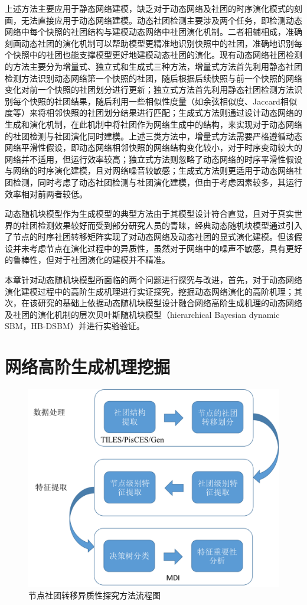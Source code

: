 上述方法主要应用于静态网络建模，缺乏对于动态网络及社团的时序演化模式的刻画，无法直接应用于动态网络建模。动态社团检测主要涉及两个任务，即检测动态网络中每个快照的社团结构与建模动态网络中社团演化机制。二者相辅相成，准确刻画动态社团的演化机制可以帮助模型更精准地识别快照中的社团，准确地识别每个快照中的社团也能支撑模型更好地建模动态社团的演化。现有动态网络社团检测的方法主要分为增量式、独立式和生成式三种方法，增量式方法首先利用静态社团检测方法识别动态网络第一个快照的社团，随后根据后续快照与前一个快照的网络变化对前一个快照的社团划分进行更新；独立式方法首先利用静态社团检测方法识别每个快照的社团结果，随后利用一些相似性度量（如余弦相似度、Jaccard相似度等）来将相邻快照的社团划分结果进行匹配；生成式方法则通过设计动态网络的生成和演化机制，在此机制中将社团作为网络生成中的结构，来实现对于动态网络的社团检测与社团演化同时建模。上述三类方法中，增量式方法需要严格遵循动态网络平滑性假设，即动态网络相邻快照的网络结构变化较小，对于时序变动较大的网络并不适用，但运行效率较高；独立式方法则忽略了动态网络的时序平滑性假设与网络的时序演化建模，且对网络噪音较敏感；生成式方法则更适用于动态网络社团检测，同时考虑了动态社团检测与社团演化建模，但由于考虑因素较多，其运行效率相对前两者较低。

动态随机块模型\cite{yang2011detecting}作为生成模型的典型方法由于其模型设计符合直觉，且对于真实世界的社团检测效果较好而受到部分研究人员的青睐，经典动态随机块模型通过引入了节点的时序社团转移矩阵实现了对动态网络及动态社团的显式演化建模。但该假设并未考虑节点在演化过程中的异质性，虽然对于网络中的噪声不敏感，具有更好的鲁棒性，但对于社团演化的建模并不精准。

本章针对动态随机块模型所面临的两个问题进行探究与改进，首先，对于动态网络演化建模过程中的高阶生成机理进行实证探究，挖掘动态网络演化的高阶机理；其次，在该研究的基础上依据动态随机块模型设计融合网络高阶生成机理的动态网络及社团的演化机制的层次贝叶斯随机块模型（hierarchical Bayesian dynamic SBM，HB-DSBM）并进行实验验证。

\section{网络高阶生成机理挖掘}


\begin{figure}[!htbp]
	\setlength{\abovecaptionskip}{0pt} 
	\setlength{\belowcaptionskip}{10pt} 
        \centering
	\includegraphics[width=.8\textwidth]{figures/chap03/figure/modelChap3.png}
	\caption{节点社团转移异质性探究方法流程图}
	\label{fig.3.1}
\end{figure}

